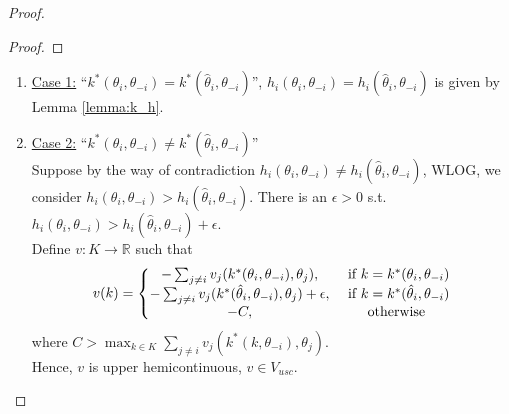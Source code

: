 \documentclass[11pt]{elegantbook}
\begin{document}
\begin{proof}
\begin{proof}
    \end{proof}
    \begin{enumerate}
        \item \underline{Case 1:} ``$k^*(\theta_i,\theta_{-i})=k^*(\hat{\theta}_i,\theta_{-i})$'', $h_i(\theta_i,\theta_{-i})=h_i(\hat{\theta}_i,\theta_{-i})$ is given by Lemma \ref{lemma:k_h}.
        \item \underline{Case 2:} ``$k^*(\theta_i,\theta_{-i})\neq k^*(\hat{\theta}_i,\theta_{-i})$''\\
        Suppose by the way of contradiction $h_i(\theta_i,\theta_{-i})\neq h_i(\hat{\theta}_i,\theta_{-i})$, WLOG, we consider $h_i(\theta_i,\theta_{-i})>h_i(\hat{\theta}_i,\theta_{-i})$. There is an $\epsilon>0$ s.t. $h_i(\theta_i,\theta_{-i})>h_i(\hat{\theta}_i,\theta_{-i})+\epsilon$.\\
        Define $v: K \rightarrow \mathbb{R}$ such that
        \begin{equation}
            \begin{aligned}
                v(k)=\left\{\begin{matrix}
                    -\sum_{j\neq i}v_j(k^*(\theta_i,\theta_{-i}),\theta_j),& \textnormal{ if }k=k^*(\theta_i,\theta_{-i})\\
                    -\sum_{j\neq i}v_j(k^*(\hat{\theta}_i,\theta_{-i}),\theta_j)+\epsilon,& \textnormal{ if }k=k^*(\hat{\theta}_i,\theta_{-i})\\
                    -C,&\textnormal{ otherwise}\
                \end{matrix}\right.
            \end{aligned}
            \nonumber
        \end{equation}
        where $C>\max_{k\in K}\sum_{j\neq i}v_j(k^*(k,\theta_{-i}),\theta_j)$.\\
        Hence, $v$ is upper hemicontinuous, $v\in V_{usc}$.


\end{enumerate}
\end{proof}
\end{document}
